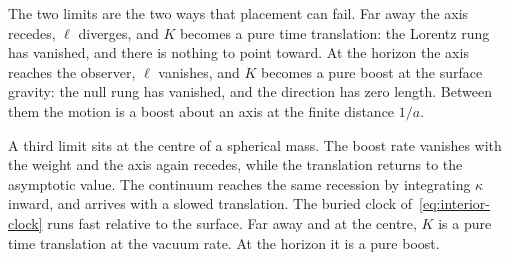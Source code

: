 \documentclass[a4paper]{article}
\begin{document}
The two limits are the two ways that placement can fail. Far away the axis recedes, \(\ell\) diverges, and \(K\) becomes a pure time translation: the Lorentz rung has vanished, and there is nothing to point toward. At the horizon the axis reaches the observer, \(\ell\) vanishes, and \(K\) becomes a pure boost at the surface gravity: the null rung has vanished, and the direction has zero length. Between them the motion is a boost about an axis at the finite distance \(1/a\).

A third limit sits at the centre of a spherical mass. The boost rate vanishes with the weight and the axis again recedes, while the translation returns to the asymptotic value. The continuum reaches the same recession by integrating \(\kappa\) inward, and arrives with a slowed translation. The buried clock of~\eqref{eq:interior-clock} runs fast relative to the surface. Far away and at the centre, \(K\) is a pure time translation at the vacuum rate. At the horizon it is a pure boost.
\end{document}
